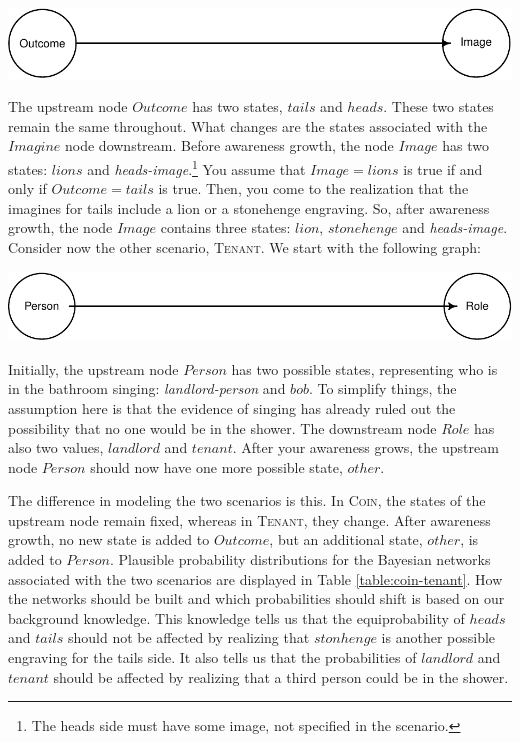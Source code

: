 \documentclass[
  11pt,
  dvipsnames,enabledeprecatedfontcommands]{scrartcl}
\begin{document}
\begin{center}\includegraphics[width=0.5\linewidth,height=0.3\textheight]{ReplyToSteeleStefansson4_files/figure-latex/tailsDAG-1} \end{center}

\noindent The upstream node \(Outcome\) has two states, \(tails\) and
\(heads\). These two states remain the same throughout. What changes are
the states associated with the \(Imagine\) node downstream. Before
awareness growth, the node \(Image\) has two states: \(lions\) and
\textit{heads-image}.\footnote{The heads side must have some image, not
  specified in the scenario.} You assume that \(Image=lions\) is true if
and only if \(Outcome=tails\) is true. Then, you come to the realization
that the imagines for tails include a lion or a stonehenge engraving.
So, after awareness growth, the node \(Image\) contains three states:
\(lion\), \(stonehenge\) and \textit{heads-image}. Consider now the
other scenario, \textsc{Tenant}. We start with the following graph:

\begin{center}\includegraphics[width=0.5\linewidth,height=0.3\textheight]{ReplyToSteeleStefansson4_files/figure-latex/tenantsDAG-1} \end{center}

\noindent Initially, the upstream node \(Person\) has two possible
states, representing who is in the bathroom singing:
\textit{landlord-person} and \(bob\). To simplify things, the assumption
here is that the evidence of singing has already ruled out the
possibility that no one would be in the shower. The downstream node
\(Role\) has also two values, \(landlord\) and \(tenant\). After your
awareness grows, the upstream node \(Person\) should now have one more
possible state, \(other\).

The difference in modeling the two scenarios is this. In \textsc{Coin},
the states of the upstream node remain fixed, whereas in
\textsc{Tenant}, they change. After awareness growth, no new state is
added to \(Outcome\), but an additional state, \(other\), is added to
\(Person\). Plausible probability distributions for the Bayesian
networks associated with the two scenarios are displayed in Table
\ref{table:coin-tenant}. How the networks should be built and which
probabilities should shift is based on our background knowledge. This
knowledge tells us that the equiprobability of \(heads\) and \(tails\)
should not be affected by realizing that \(stonhenge\) is another
possible engraving for the tails side. It also tells us that the
probabilities of \(landlord\) and \(tenant\) should be affected by
realizing that a third person could be in the shower.
\end{document}
